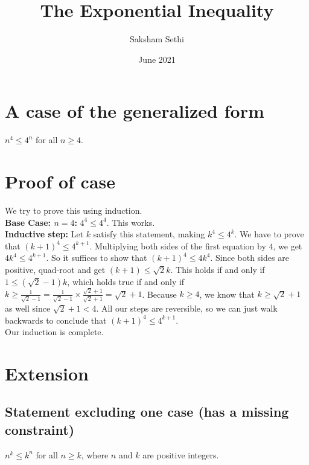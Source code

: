 \documentclass{article}
\title{The Exponential Inequality}
\author{Saksham Sethi}
\date{June 2021}
\begin{document}
\maketitle
\noindent\makebox[\linewidth]{\rule{\paperwidth}{0.8pt}}

\section{A case of the generalized form}
$n^4 \le 4^n$ for all $n \ge 4$.\\


\noindent\makebox[\linewidth]{\rule{\paperwidth}{0.8pt}}
\section{Proof of case}
We try to prove this using induction. \\



\textbf{Base Case: $n=4$:} $4^4 \le 4^4$. This works. 
\\




\textbf{Inductive step:}  Let $k$ satisfy this statement, making $k^4 \le 4^k$. We have to prove that $(k+1)^4 \le 4^{k+1}$. Multiplying both sides of the first equation by $4$, we get $4k^4 \le 4^{k+1}$. So it suffices to show that $(k+1)^4 \le 4k^4$. Since both sides are positive, quad-root and get $(k+1) \le \sqrt{2}k$. This holds if and only if $1 \le (\sqrt{2}-1)k$, which holds true if and only if$k \ge \frac{1}{\sqrt{2}-1} = \frac{1}{\sqrt{2}-1} \times \frac{\sqrt{2}+1}{\sqrt{2}+1} = \sqrt{2}+1$. Because $k\ge4$, we know that $k\ge \sqrt{2}+1$ as well since $\sqrt{2}+1 < 4$. All our steps are reversible, so we can just walk backwards to conclude that $(k+1)^4 \le 4^{k+1}$. \\

Our induction is complete. 

\noindent\makebox[\linewidth]{\rule{\paperwidth}{0.8pt}}


\section{Extension}
\subsection{Statement excluding one case (has a missing constraint)}
$n^k \le k^n$ for all $n\ge k$, where $n$ and $k$ are positive integers. 
\end{document}
